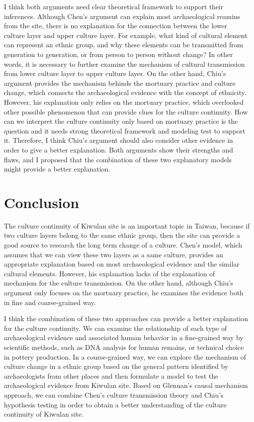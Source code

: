 \documentclass[10pt]{article}
\begin{document}
I think both arguments need clear theoretical framework to support their
inferences. Although Chen's argument can explain most archaeological
reamins from the site, there is no explanation for the connection
between the lower culture layer and upper culture layer. For example,
what kind of cultural element can represent an ethnic group, and why
these elements can be transmitted from generation to generation, or from
person to person without change? In other words, it is necessary to
further examine the mechanism of cultural transmission from lower
culture layer to upper culture layer. On the other hand, Chiu's argument
provides the mechanism behinds the mortuary practice and culture change,
which connects the archaeological evidence with the concept of
ethnicity. However, his explanation only relies on the mortuary
practice, which overlooked other possible phenomenon that can provide
clues for the culture continuity. How can we interpret the culture
continuity only based on mortuary practice is the question and it needs
strong theoretical framework and modeling test to support it. Therefore,
I think Chiu's argument should also consider other evidence in order to
give a better explanation. Both arguments show their strengths and
flaws, and I proposed that the combination of these two explanatory
models might provide a better explanation.

\section*{Conclusion}\label{conclusion}

The culture continuity of Kiwulan site is an important topic in Taiwan,
because if two culture layers belong to the same ethnic group, then the
site can provide a good source to research the long term change of a
culture. Chen's model, which assumes that we can view these two layers
as a same culture, provides an appropriate explanation based on most
archaeological evidence and the similar cultural elements. However, his
explanation lacks of the explanation of mechanism for the culture
transmission. On the other hand, although Chiu's argument only focuses
on the mortuary practice, he examines the evidence both in fine and
coarse-grained way.

I think the combination of these two approaches can provide a better
explanation for the culture continuity. We can examine the relationship
of each type of archaeological evidence and associated human behavior in
a fine-grained way by scientific methods, such as DNA analysis for human
remains, or technical choice in pottery production. In a course-grained
way, we can explore the mechanism of culture change in a ethnic group
based on the general pattern identified by archaeologists from other
places and then formulate a model to test the archaeological evidence
from Kiwulan site. Based on Glennan's causal mechanism approach, we can
combine Chen's culture transmission theory and Chiu's hypothesis testing
in order to obtain a better understanding of the culture continuity of
Kiwulan site.
\end{document}
